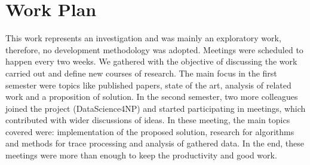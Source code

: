 \section{Work Plan}
\label{sec:work_plan}



This work represents an investigation and was mainly an exploratory work, therefore, no development methodology was adopted. Meetings were scheduled to happen every two weeks. We gathered with the objective of discussing the work carried out and define new courses of research. The main focus in the first semester were topics like published papers, state of the art, analysis of related work and a proposition of solution. In the second semester, two more colleagues joined the project (DataScience4NP) and started participating in meetings, which contributed with wider discussions of ideas. In these meeting, the main topics covered were: implementation of the proposed solution, research for algorithms and methods for trace processing and analysis of gathered data. In the end, these meetings were more than enough to keep the productivity and good work.

